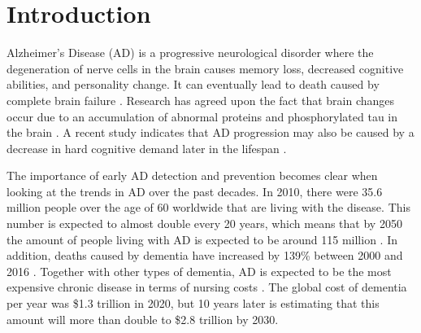 \documentclass[11pt, a4paper]{article}
\begin{document}
\section{Introduction} \label{sec:introduction}
Alzheimer’s Disease (AD) is a progressive neurological disorder where the degeneration of nerve cells in the brain causes memory loss, decreased cognitive abilities, and personality change. It can eventually lead to death caused by complete brain failure \citep{BrightFocusFoundation2022Alzheimers:Stats}. Research has agreed upon the fact that brain changes occur due to an accumulation of abnormal proteins and phosphorylated tau in the brain \citep{AlzheimersAssociation20222022Figures}. A recent study indicates that AD progression may also be caused by a decrease in hard cognitive demand later in the lifespan \citep{Turknett2022DemandDementia}.

The importance of early AD detection and prevention becomes clear when looking at the trends in AD over the past decades. In 2010, there were 35.6 million people over the age of 60 worldwide that are living with the disease. This number is expected to almost double every 20 years, which means that by 2050 the amount of people living with AD is expected to be around 115 million \citep{Prince2013TheMetaanalysis}. In addition, deaths caused by dementia have increased by 139\% between 2000 and 2016 \cite{AlzheimersDiseaseInternational2020DementiaStatistics}. Together with other types of dementia, AD is expected to be the most expensive chronic disease in terms of nursing costs \citep{Ebrahimighahnavieh2020DeepReview}. The global cost of dementia per year was \$1.3 trillion in 2020, but 10 years later \cite{AlzheimersDiseaseInternational2020DementiaStatistics} is estimating that this amount will more than double to \$2.8 trillion by 2030.
\end{document}
